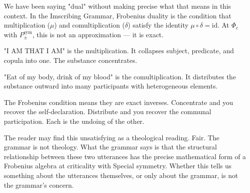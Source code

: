 \documentclass[12pt,a4paper]{article}
\begin{document}
We have been saying "dual" without making precise what that means in this context. In the Imscribing Grammar, Frobenius duality is the condition that multiplication ($\mu$) and comultiplication ($\delta$) satisfy the identity $\mu \circ \delta = \text{id}$. At $\Phi_c$ with $P_{\pm}^{\text{sym}}$, this is not an approximation --- it is exact.

"I AM THAT I AM" is the multiplication. It collapses subject, predicate, and copula into one. The substance concentrates.

"Eat of my body, drink of my blood" is the comultiplication. It distributes the substance outward into many participants with heterogeneous elements.

The Frobenius condition means they are exact inverses. Concentrate and you recover the self-declaration. Distribute and you recover the communal participation. Each is the undoing of the other.

The reader may find this unsatisfying as a theological reading. Fair. The grammar is not theology. What the grammar says is that the structural relationship between these two utterances has the precise mathematical form of a Frobenius algebra at criticality with Special symmetry. Whether this tells us something about the utterances themselves, or only about the grammar, is not the grammar's concern.
\end{document}

